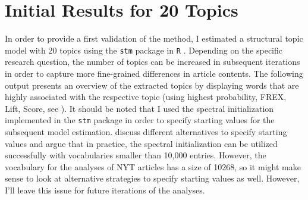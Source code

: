 \documentclass[12pt]{article}\usepackage[]{graphicx}\usepackage[]{color}
\begin{document}
\section{Initial Results for 20 Topics}

In order to provide a first validation of the method, I estimated a structural topic model with 20 topics using the \texttt{stm} package in \texttt{R} \citep{roberts2014structural,roberts2014stm}. Depending on the specific research question, the number of topics can be increased in subsequent iterations in order to capture more fine-grained differences in article contents. The following output presents an overview of the extracted topics by displaying words that are highly associated with the respective topic (using highest probability, FREX, Lift, Score, see \citealt{roberts2014stm}). It should be noted that I used the spectral initialization implemented in the \texttt{stm} package in order to specify starting values for the subsequent model estimation. \citet[12-13]{roberts2014stm} discuss different alternatives to specify starting values and argue that in practice, the spectral initialization can be utilized successfully with vocabularies smaller than 10,000 entries. However, the vocabulary for the analyses of NYT articles has a size of 10268, so it might make sense to look at alternative strategies to specify starting values as well. However, I'll leave this issue for future iterations of the analyses.
\end{document}

